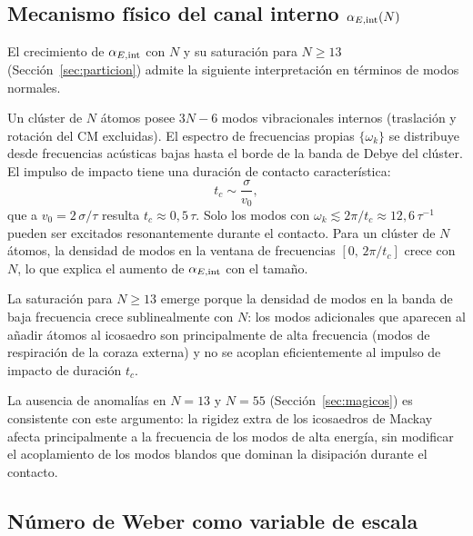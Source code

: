 \subsection{Mecanismo físico del canal interno \texorpdfstring{$\alpha_{E,\mathrm{int}}(N)$}{α\_int(N)}}
\label{sec:mecanismo_alfa}

El crecimiento de $\alpha_{E,\mathrm{int}}$ con $N$ y su saturación para $N \geq 13$
(Sección~\ref{sec:particion}) admite la siguiente interpretación en términos
de modos normales.

Un clúster de $N$ átomos posee $3N - 6$ modos vibracionales internos
(traslación y rotación del CM excluidas). El espectro de frecuencias propias
$\{\omega_k\}$ se distribuye desde frecuencias acústicas bajas hasta el
borde de la banda de Debye del clúster. El impulso de impacto tiene una
duración de contacto característica:
\begin{equation}
    t_c \sim \frac{\sigma}{v_0},
    \label{eq:tc}
\end{equation}
que a $v_0 = 2\,\sigma/\tau$ resulta $t_c \approx 0{,}5\,\tau$. Solo los modos
con $\omega_k \lesssim 2\pi/t_c \approx 12{,}6\,\tau^{-1}$ pueden ser excitados
resonantemente durante el contacto. Para un clúster de $N$ átomos, la densidad
de modos en la ventana de frecuencias $[0,\, 2\pi/t_c]$ crece con $N$, lo que
explica el aumento de $\alpha_{E,\mathrm{int}}$ con el tamaño.

La saturación para $N \geq 13$ emerge porque la densidad de modos en la banda
de baja frecuencia crece sublinealmente con $N$: los modos adicionales que
aparecen al añadir átomos al icosaedro son principalmente de alta frecuencia
(modos de respiración de la coraza externa) y no se acoplan eficientemente al
impulso de impacto de duración $t_c$.

La ausencia de anomalías en $N=13$ y $N=55$ (Sección~\ref{sec:magicos})
es consistente con este argumento: la rigidez extra de los icosaedros de
Mackay afecta principalmente a la frecuencia de los modos de alta energía,
sin modificar el acoplamiento de los modos blandos que dominan la disipación
durante el contacto.

\subsection{Número de Weber como variable de escala}
\label{sec:weber_discusion}

